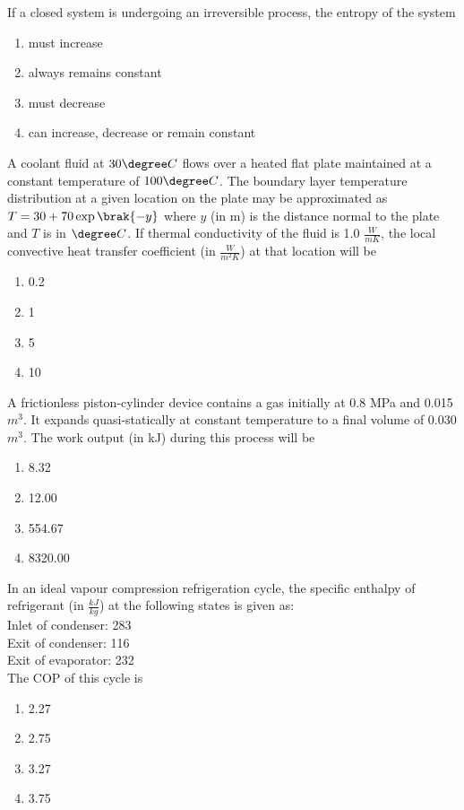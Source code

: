 \item If a closed system is undergoing an irreversible process, the entropy
of the system
\begin{enumerate}
    \item must increase
    \item always remains constant
    \item must decrease
    \item can increase, decrease or remain constant
\end{enumerate}

\item A coolant fluid at $30 \degree C$ flows over a heated flat plate
maintained at a constant temperature of $100 \degree C$. The boundary
layer temperature distribution at a given location on the plate may be
approximated as $T = 30 + 70\exp\brak{-y}$ where $y$ (in m) is the
distance normal to the plate and $T$ is in $\degree C$. If thermal
conductivity of the fluid is 1.0 $\frac{W}{mK}$, the local convective heat
transfer coefficient (in $\frac{W}{m^2K}$) at that location will be
\begin{multicols}{4}
\begin{enumerate}
    \item 0.2
    \item 1
    \item 5
    \item 10
\end{enumerate}
\end{multicols}

\item A frictionless piston-cylinder device contains a gas initially at
0.8 MPa and 0.015 $m^3$. It expands quasi-statically at constant
temperature to a final volume of 0.030 $m^3$. The work output (in kJ)
during this process will be
\begin{multicols}{4}
\begin{enumerate}
    \item 8.32
    \item 12.00
    \item 554.67
    \item 8320.00
\end{enumerate}
\end{multicols}

\item In an ideal vapour compression refrigeration cycle, the specific
enthalpy of refrigerant (in $\frac{kJ}{kg}$) at the following states is given as: \\
Inlet of condenser: 283 \\
Exit of condenser: 116 \\
Exit of evaporator: 232 \\
The COP of this cycle is
\begin{multicols}{4}
\begin{enumerate}
    \item 2.27
    \item 2.75
    \item 3.27
    \item 3.75
\end{enumerate}
\end{multicols}

